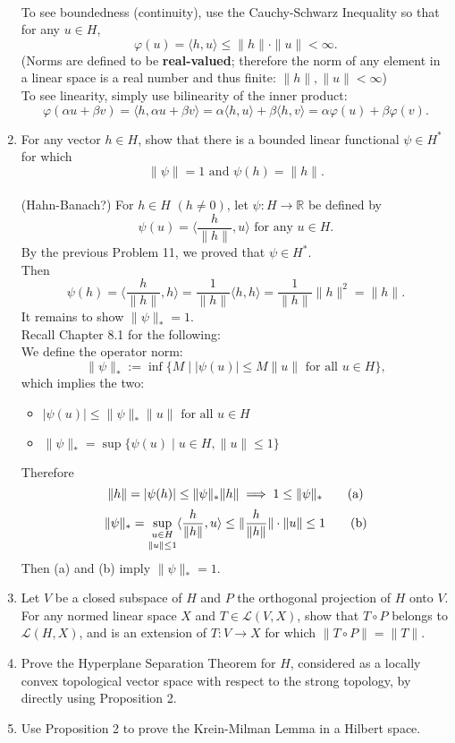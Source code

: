 \begin{enumerate}
    \\To see boundedness (continuity), use the Cauchy-Schwarz Inequality so that for any $u\in H$,
    \[
        \varphi(u)=\langle h,u\rangle\le\|h\|\cdot\|u\|<\infty.
    \]
    (Norms are defined to be \textbf{real-valued}; therefore the norm of any element in a linear space is a real number and thus finite: $\|h\|,\|u\|<\infty$)
    \\To see linearity, simply use bilinearity of the inner product:
    \[
        \varphi(\alpha u+\beta v)=\langle h,\alpha u+\beta v\rangle=\alpha\langle h,u\rangle+\beta\langle h,v\rangle=\alpha\varphi(u)+\beta\varphi(v).
    \]
    \item For any vector $h\in H$, show that there is a bounded linear functional $\psi\in H^*$ for which 
    \[
        \|\psi\|=1\text{ and }\psi(h)=\|h\|.  
    \]
    \\(Hahn-Banach?) For $h\in H$ $(h\neq0)$, let $\psi:H\to\mathbb{R}$ be defined by 
    \[
        \psi(u)=\langle \frac{h}{\|h\|},u\rangle\text{ for any }u\in H.
    \]
    By the previous Problem 11, we proved that $\psi\in H^*$.
    \\Then 
    \[
        \psi(h)=\langle \frac{h}{\|h\|},h\rangle=\frac{1}{\|h\|}\langle h,h\rangle=\frac{1}{\|h\|}\|h\|^2=\|h\|.
    \]
    It remains to show $\|\psi\|_*=1$.
    \\Recall Chapter 8.1 for the following:
    \\We define the operator norm:
    \[
        \|\psi\|_*:=\inf\{M\mid|\psi(u)|\le M\|u\|\text{ for all }u\in H\},
    \]
    which implies the two: 
    \begin{itemize}
        \item $|\psi(u)|\le \|\psi\|_*\|u\|\text{ for all }u\in H$
        \item $\|\psi\|_*=\sup\{\psi(u)\mid u\in H, \|u\|\le1\}$
    \end{itemize}
    Therefore
    \[
        \|h\|=|\psi(h)|\le \|\psi\|_*\|h\|\implies 1\le \|\psi\|_*\tag{\text{a}}
    \]
    \[
        \|\psi\|_*=\underset{\|u\|\le1}{\underset{u\in H}{\sup}}\langle \frac{h}{\|h\|},u\rangle\le \|\frac{h}{\|h\|}\|\cdot\|u\|\le1\tag{\text{b}}
    \]
    Then (a) and (b) imply $\|\psi\|_*=1$.
    \item Let $V$ be a closed subspace of $H$ and $P$ the orthogonal projection of $H$ onto $V$.
    For any normed linear space $X$ and $T\in\mathcal{L}(V,X)$, show that $T\circ P$ belongs to $\mathcal{L}(H,X)$, and is an extension of $T:V\to X$ for which $\|T\circ P\|=\|T\|$.
    \item Prove the Hyperplane Separation Theorem for $H$, considered as a locally convex topological vector space with respect to the strong topology, by directly using Proposition 2.
    \item Use Proposition 2 to prove the Krein-Milman Lemma in a Hilbert space.
\end{enumerate}


